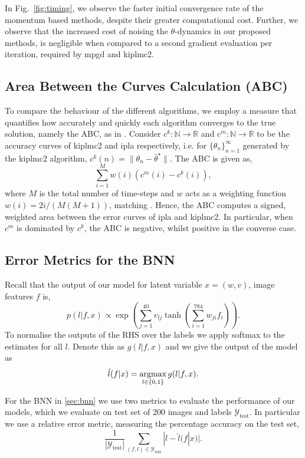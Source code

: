 In Fig.~\ref{fig:timing}, we observe the faster initial convergence rate of the momentum based methods, despite their greater computational cost. Further, we observe that the increased cost of noising the $\theta$-dynamics in our proposed methods, is negligible when compared to a second gradient evaluation per iteration, required by \gls*{mpgd} and \gls*{kiplmc2}.


\subsection{Area Between the Curves Calculation (ABC)}\label{sec:ABC}
To compare the behaviour of the different algorithms, we employ a measure that quantifies how accurately and quickly each algorithm converges to the true solution, namely the ABC, as in \citep{lim2023momentum}. Consider $c^k:\mathbb{N}\to \mathbb{R}$ and $c^m:\mathbb{N}\to \mathbb{R}$ to be the accuracy curves of \gls*{kiplmc2} and \gls*{ipla} respectively, i.e. for $\{\theta_n\}_{n=1}^\infty$ generated by the \gls*{kiplmc2} algorithm, $c^k(n)=\|\theta_n -\bar{\theta}^\star\|$. The ABC is given as,
\[\sum_{i=1}^M w(i) (c^m(i)-c^k(i)),\]
where $M$ is the total number of time-steps and $w$ acts as a weighting function $w(i)=2i/(M(M+1))$, matching \citep{kuntz2023particle}. Hence, the ABC computes a signed, weighted area between the error curves of \gls*{ipla} and \gls*{kiplmc2}. In particular, when $c^m$ is dominated by $c^k$, the ABC is negative, whilst positive in the converse case.


\subsection{Error Metrics for the BNN}\label{sec:err}
Recall that the output of our model for latent variable $x=(w,v)$, image features $f$ is,
\begin{equation*}
p(l|f, x) \propto \exp\left(\sum_{j=1}^{40} v_{lj} \tanh\left(\sum_{i=1}^{784} w_{ji} f_i\right)\right).
\end{equation*}
To normalise the outputs of the RHS over the labels we apply softmax to the estimates for all $l$. Denote this as $g(l|f,x)$ and we give the output of the model as
\begin{equation*}
\hat{l}(f|x) = \argmax_{l\in\{0,1\}} g(l|f,x).
\end{equation*}

For the BNN in \ref{sec:bnn} we use two metrics to evaluate the performance of our models, which we evaluate on test set of 200 images and labels $\mathcal{Y}_\text{test}$. In particular we use a relative error metric, measuring the percentage accuracy on the test set,
\begin{equation*}
\frac{1}{|\mathcal{Y}_\text{test}|}\sum_{(f,l)\in\mathcal{Y}_\text{test}} |l - \hat{l}(f|x)|.
\end{equation*}

